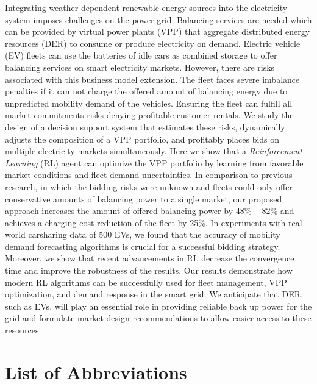 \documentclass[a4paper, 12pt]{article}
\begin{document}
Integrating weather-dependent renewable energy sources into the electricity
system imposes challenges on the power grid. Balancing services are needed which
can be provided by virtual power plants (VPP) that aggregate distributed energy
resources (DER) to consume or produce electricity on demand. Electric vehicle
(EV) fleets can use the batteries of idle cars as combined storage to offer
balancing services on smart electricity markets. However, there are risks
associated with this business model extension. The fleet faces severe imbalance
penalties if it can not charge the offered amount of balancing energy due to
unpredicted mobility demand of the vehicles. Ensuring the fleet can fulfill all
market commitments risks denying profitable customer rentals. We study the
design of a decision support system that estimates these risks, dynamically
adjusts the composition of a VPP portfolio, and profitably places bids on
multiple electricity markets simultaneously. Here we show that a
\emph{Reinforcement Learning} (RL) agent can optimize the VPP portfolio by
learning from favorable market conditions and fleet demand uncertainties. In
comparison to previous research, in which the bidding risks were unknown and
fleets could only offer conservative amounts of balancing power to a single
market, our proposed approach increases the amount of offered balancing power by
$48\% - 82\%$  and achieves a charging cost reduction of the fleet by 25\%. In
experiments with real-world carsharing data of 500 EVs, we found that the
accuracy of mobility demand forecasting algorithms is crucial for a successful
bidding strategy. Moreover, we show that recent advancements in RL decrease
the convergence time and improve the robustness of the results. Our results
demonstrate how modern RL algorithms can be successfully used for fleet
management, VPP optimization, and demand response in the smart grid. We
anticipate that DER, such as EVs, will play an essential role in providing
reliable back up power for the grid and formulate market design recommendations
to allow easier access to these resources.

\vspace*{\fill}
\clearpage

\setcounter{page}{1}
\tableofcontents
\clearpage
\listoffigures
\clearpage
\listoftables
\clearpage

\section*{List of Abbreviations} 
\begin{acronym}[GCRM]
\end{acronym}
\clearpage
\end{document}
